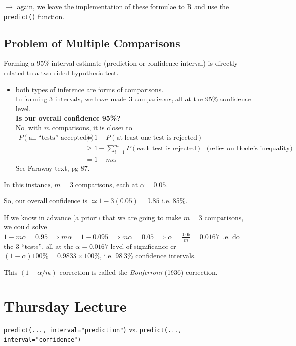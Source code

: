 \documentclass[a4paper, 11pt, twoside]{article}
\begin{document}
$\rightarrow$ again, we leave the implementation of these formulae to R and use the \texttt{predict()} function.

\subsection{Problem of Multiple Comparisons}

Forming a 95\% interval estimate (prediction or confidence interval) is directly related to a two-sided hypothesis test.

\begin{itemize}
	\item both types of inference are forms of comparisons.\\
	In forming 3 intervals, we have made 3 comparisons, all at the 95\% confidence level.\\
	\textbf{Is our overall confidence 95\%?}\\
	No, with $m$ comparisons, it is closer to
	\[
	\begin{split}
		P(\text{all ``tests'' accepted)})&=1-P(\text{at least one test is rejected})\\
		&\geq 1-\sum^m_{i=1}P(\text{each test is rejected})\ \ \ \text{(relies on Boole's inequality)}\\
		&=1-m\alpha
	\end{split}
	\]
	See Faraway text, pg 87.
\end{itemize}

In this instance, $m=3$ comparisons, each at $\alpha=0.05$.

So, our overall confidence is $\simeq 1-3(0.05)=0.85$ i.e. 85\%.

If we know in advance (a priori) that we are going to make $m=3$ comparisons, we could solve $1-m\alpha=0.95\implies m\alpha=1-0.095\implies m\alpha=0.05\implies \alpha=\frac{0.05}{m}=0.0167$ i.e. do the 3 ``tests'', all at the $\alpha=0.0167$ level of significance or $(1-\alpha) 100\% = 0.9833\times 100\%$, i.e. 98.3\% confidence  intervals.

This $(1-\alpha/m)$ correction is called  the \textit{Bonferroni} (1936) correction. 

\section{Thursday Lecture}

\texttt{predict(..., interval="prediction")} vs. \texttt{predict(..., interval="confidence")}
\end{document}
